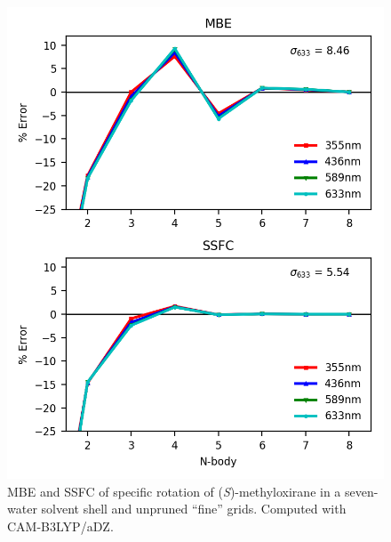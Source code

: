     \begin{figure}
        \centering
        \includegraphics[scale=0.75]{p1/graphs/si/metox_7_noprune.png}
        \caption{MBE and SSFC of specific rotation of (\textit{S})-methyloxirane in a seven-water solvent shell and unpruned ``fine'' grids. Computed with CAM-B3LYP/aDZ.}
        \label{metox7_noprune.png}
      \end{figure}

\clearpage
